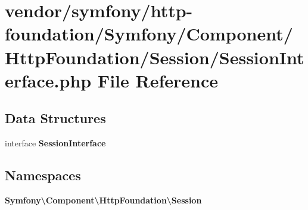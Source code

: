 \section{vendor/symfony/http-\/foundation/\+Symfony/\+Component/\+Http\+Foundation/\+Session/\+Session\+Interface.php File Reference}
\label{symfony_2http-foundation_2_symfony_2_component_2_http_foundation_2_session_2_session_interface_8php}
\subsection*{Data Structures}
\begin{DoxyCompactItemize}
\item 
interface {\bf Session\+Interface}
\end{DoxyCompactItemize}
\subsection*{Namespaces}
\begin{DoxyCompactItemize}
\item 
 {\bf Symfony\textbackslash{}\+Component\textbackslash{}\+Http\+Foundation\textbackslash{}\+Session}
\end{DoxyCompactItemize}
